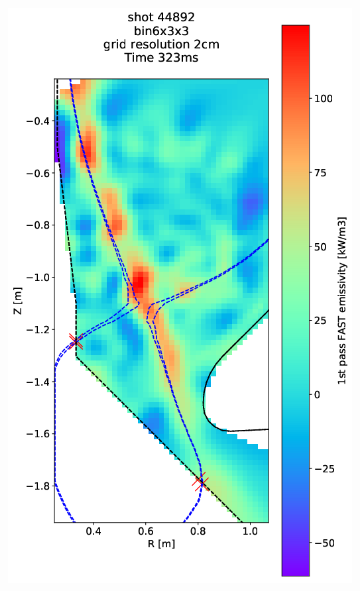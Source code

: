\begin{figure}
\begin{subfigure}{0.2\textwidth}
         \includegraphics[trim={70 0 25 0},clip,width=\textwidth]{Chapters/chapter2/figs/44892_3.png}
         \label{fig:44892_3}
     \end{subfigure}
     \hfill
     \begin{subfigure}{0.21\textwidth}
         \centering

\end{subfigure}
\end{figure}
